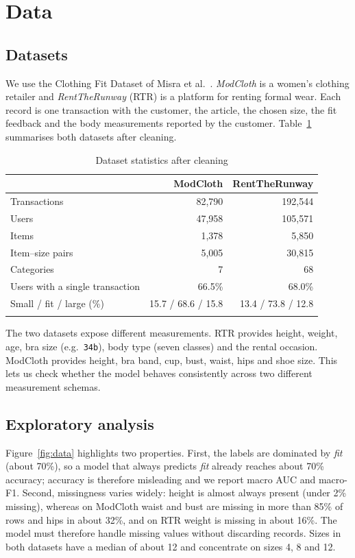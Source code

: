 \section{Data}\label{sec3}

\subsection{Datasets}
We use the Clothing Fit Dataset of Misra et al.~\cite{misra2018fit}. \emph{ModCloth} is a women's clothing retailer and \emph{RentTheRunway} (RTR) is a platform for renting formal wear. Each record is one transaction with the customer, the article, the chosen size, the fit feedback and the body measurements reported by the customer. Table~\ref{tab:data} summarises both datasets after cleaning.

\begin{table}[h]
\caption{Dataset statistics after cleaning}\label{tab:data}
\begin{tabular*}{\textwidth}{@{\extracolsep\fill}lrr}
\toprule
 & ModCloth & RentTheRunway \\
\midrule
Transactions & 82,790 & 192,544 \\
Users & 47,958 & 105,571 \\
Items & 1,378 & 5,850 \\
Item--size pairs & 5,005 & 30,815 \\
Categories & 7 & 68 \\
Users with a single transaction & 66.5\% & 68.0\% \\
Small / fit / large (\%) & 15.7 / 68.6 / 15.8 & 13.4 / 73.8 / 12.8 \\
\botrule
\end{tabular*}
\end{table}

The two datasets expose different measurements. RTR provides height, weight, age, bra size (e.g.\ \texttt{34b}), body type (seven classes) and the rental occasion. ModCloth provides height, bra band, cup, bust, waist, hips and shoe size. This lets us check whether the model behaves consistently across two different measurement schemas.

\subsection{Exploratory analysis}
Figure~\ref{fig:data} highlights two properties. First, the labels are dominated by \emph{fit} (about 70\%), so a model that always predicts \emph{fit} already reaches about 70\% accuracy; accuracy is therefore misleading and we report macro AUC and macro-F1. Second, missingness varies widely: height is almost always present (under 2\% missing), whereas on ModCloth waist and bust are missing in more than 85\% of rows and hips in about 32\%, and on RTR weight is missing in about 16\%. The model must therefore handle missing values without discarding records. Sizes in both datasets have a median of about 12 and concentrate on sizes 4, 8 and 12.

